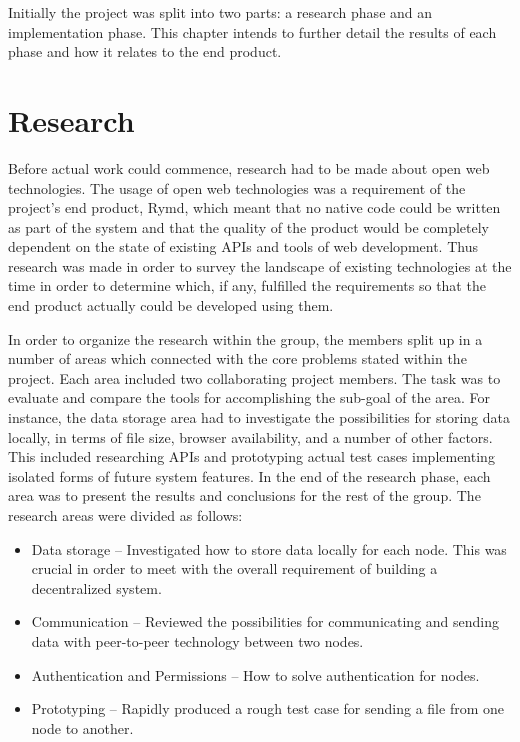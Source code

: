 Initially the project was split into two parts: a research phase and an implementation phase. This chapter intends to further detail the results of each phase and how it relates to the end product.

\section{Research}

Before actual work could commence, research had to be made about open web technologies. The usage of open web technologies was a requirement of the project's end product, Rymd, which meant that no native code could be written as part of the system and that the quality of the product would be completely dependent on the state of existing APIs and tools of web development. Thus research was made in order to survey the landscape of existing technologies at the time in order to determine which, if any, fulfilled the requirements so that the end product actually could be developed using them.

In order to organize the research within the group, the members split up in a number of areas which connected with the core problems stated within the project. Each area included two collaborating project members. The task was to evaluate and compare the tools for accomplishing the sub-goal of the area. For instance, the data storage area had to investigate the possibilities for storing data locally, in terms of file size, browser availability, and a number of other factors. This included researching APIs and prototyping actual test cases implementing isolated forms of future system features. In the end of the research phase, each area was to present the results and conclusions for the rest of the group. The research areas were divided as follows:

\begin{itemize}
\item Data storage – Investigated how to store data locally for each node. This was crucial in order to meet with the overall requirement of building a decentralized system.
\item Communication – Reviewed the possibilities for communicating and sending data with peer-to-peer technology between two nodes.
\item Authentication and Permissions – How to solve authentication for nodes.
\item Prototyping – Rapidly produced a rough test case for sending a file from one node to another.
\end{itemize}

